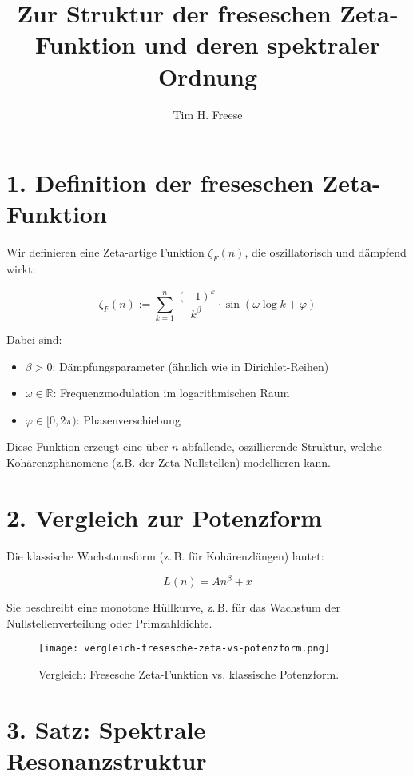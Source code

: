\documentclass[11pt]{article}
\title{Zur Struktur der freseschen Zeta-Funktion und deren spektraler Ordnung}
\author{Tim H. Freese}
\date{}
\begin{document}
\maketitle

\section*{1. Definition der freseschen Zeta-Funktion}

Wir definieren eine Zeta-artige Funktion \(\zeta_F(n)\), die oszillatorisch und dämpfend wirkt:

\begin{equation}
\zeta_F(n) := \sum_{k=1}^{n} \frac{(-1)^k}{k^{\beta}} \cdot \sin\left( \omega \log k + \varphi \right)
\end{equation}

Dabei sind:
\begin{itemize}
    \item \(\beta > 0\): Dämpfungsparameter (ähnlich wie in Dirichlet-Reihen)
    \item \(\omega \in \mathbb{R}\): Frequenzmodulation im logarithmischen Raum
    \item \(\varphi \in [0, 2\pi)\): Phasenverschiebung
\end{itemize}

Diese Funktion erzeugt eine über \(n\) abfallende, oszillierende Struktur, welche Kohärenzphänomene (z.B. der Zeta-Nullstellen) modellieren kann.

\section*{2. Vergleich zur Potenzform}

Die klassische Wachstumsform (z. B. für Kohärenzlängen) lautet:

\begin{equation}
L(n) = A n^{\beta} + x
\end{equation}

Sie beschreibt eine monotone Hüllkurve, z.\,B. für das Wachstum der Nullstellenverteilung oder Primzahldichte.

\vspace{1em}
\begin{figure}[h]
    \centering
    \texttt{[image: vergleich-fresesche-zeta-vs-potenzform.png]}
    \caption{Vergleich: Fresesche Zeta-Funktion vs. klassische Potenzform.}
\end{figure}

\section*{3. Satz: Spektrale Resonanzstruktur}
\end{document}
